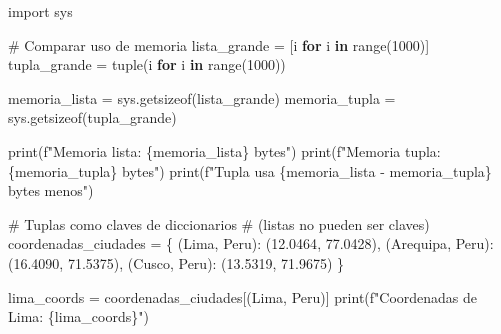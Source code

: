 \documentclass[
  doc,
  floatsintext,
  longtable,
  a4paper,
  nolmodern,
  notxfonts,
  notimes,
  12pt,
  colorlinks=true,linkcolor=blue,citecolor=blue,urlcolor=blue]{apa7}
\newenvironment{Shaded}{\begin{snugshade}}{\end{snugshade}}
\newcommand{\BuiltInTok}[1]{\textcolor[rgb]{0.00,0.23,0.31}{#1}}
\newcommand{\CommentTok}[1]{\textcolor[rgb]{0.37,0.37,0.37}{#1}}
\newcommand{\ControlFlowTok}[1]{\textcolor[rgb]{0.00,0.23,0.31}{\textbf{#1}}}
\newcommand{\DecValTok}[1]{\textcolor[rgb]{0.68,0.00,0.00}{#1}}
\newcommand{\FloatTok}[1]{\textcolor[rgb]{0.68,0.00,0.00}{#1}}
\newcommand{\ImportTok}[1]{\textcolor[rgb]{0.00,0.46,0.62}{#1}}
\newcommand{\KeywordTok}[1]{\textcolor[rgb]{0.00,0.23,0.31}{\textbf{#1}}}
\newcommand{\NormalTok}[1]{\textcolor[rgb]{0.00,0.23,0.31}{#1}}
\newcommand{\OperatorTok}[1]{\textcolor[rgb]{0.37,0.37,0.37}{#1}}
\newcommand{\SpecialCharTok}[1]{\textcolor[rgb]{0.37,0.37,0.37}{#1}}
\newcommand{\SpecialStringTok}[1]{\textcolor[rgb]{0.13,0.47,0.30}{#1}}
\newcommand{\StringTok}[1]{\textcolor[rgb]{0.13,0.47,0.30}{#1}}
\begin{document}
\begin{Shaded}
\begin{Highlighting}[]
\ImportTok{import}\NormalTok{ sys}

\CommentTok{\# Comparar uso de memoria}
\NormalTok{lista\_grande }\OperatorTok{=}\NormalTok{ [i }\ControlFlowTok{for}\NormalTok{ i }\KeywordTok{in} \BuiltInTok{range}\NormalTok{(}\DecValTok{1000}\NormalTok{)]}
\NormalTok{tupla\_grande }\OperatorTok{=} \BuiltInTok{tuple}\NormalTok{(i }\ControlFlowTok{for}\NormalTok{ i }\KeywordTok{in} \BuiltInTok{range}\NormalTok{(}\DecValTok{1000}\NormalTok{))}

\NormalTok{memoria\_lista }\OperatorTok{=}\NormalTok{ sys.getsizeof(lista\_grande)}
\NormalTok{memoria\_tupla }\OperatorTok{=}\NormalTok{ sys.getsizeof(tupla\_grande)}

\BuiltInTok{print}\NormalTok{(}\SpecialStringTok{f"Memoria lista: }\SpecialCharTok{\{}\NormalTok{memoria\_lista}\SpecialCharTok{\}}\SpecialStringTok{ bytes"}\NormalTok{)}
\BuiltInTok{print}\NormalTok{(}\SpecialStringTok{f"Memoria tupla: }\SpecialCharTok{\{}\NormalTok{memoria\_tupla}\SpecialCharTok{\}}\SpecialStringTok{ bytes"}\NormalTok{)}
\BuiltInTok{print}\NormalTok{(}\SpecialStringTok{f"Tupla usa }\SpecialCharTok{\{}\NormalTok{memoria\_lista }\OperatorTok{{-}}\NormalTok{ memoria\_tupla}\SpecialCharTok{\}}\SpecialStringTok{ bytes menos"}\NormalTok{)}

\CommentTok{\# Tuplas como claves de diccionarios}
\CommentTok{\# (listas no pueden ser claves)}
\NormalTok{coordenadas\_ciudades }\OperatorTok{=}\NormalTok{ \{}
\NormalTok{    (}\StringTok{\textquotesingle{}Lima\textquotesingle{}}\NormalTok{, }\StringTok{\textquotesingle{}Peru\textquotesingle{}}\NormalTok{): (}\FloatTok{12.0464}\NormalTok{, }\FloatTok{77.0428}\NormalTok{),}
\NormalTok{    (}\StringTok{\textquotesingle{}Arequipa\textquotesingle{}}\NormalTok{, }\StringTok{\textquotesingle{}Peru\textquotesingle{}}\NormalTok{): (}\FloatTok{16.4090}\NormalTok{, }\FloatTok{71.5375}\NormalTok{),}
\NormalTok{    (}\StringTok{\textquotesingle{}Cusco\textquotesingle{}}\NormalTok{, }\StringTok{\textquotesingle{}Peru\textquotesingle{}}\NormalTok{): (}\FloatTok{13.5319}\NormalTok{, }\FloatTok{71.9675}\NormalTok{)}
\NormalTok{\}}

\NormalTok{lima\_coords }\OperatorTok{=}\NormalTok{ coordenadas\_ciudades[(}\StringTok{\textquotesingle{}Lima\textquotesingle{}}\NormalTok{, }\StringTok{\textquotesingle{}Peru\textquotesingle{}}\NormalTok{)]}
\BuiltInTok{print}\NormalTok{(}\SpecialStringTok{f"Coordenadas de Lima: }\SpecialCharTok{\{}\NormalTok{lima\_coords}\SpecialCharTok{\}}\SpecialStringTok{"}\NormalTok{)}
\end{Highlighting}
\end{Shaded}
\end{document}
